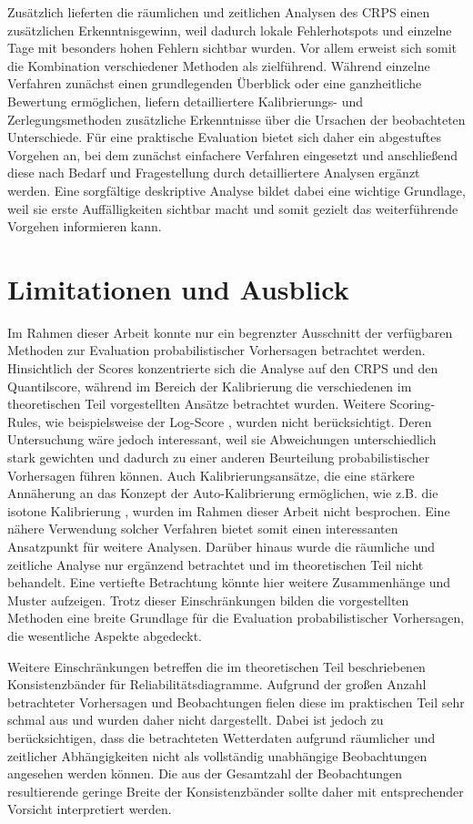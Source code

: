 Zusätzlich lieferten die räumlichen und zeitlichen Analysen des CRPS einen zusätzlichen Erkenntnisgewinn, weil dadurch lokale Fehlerhotspots und einzelne Tage mit besonders hohen Fehlern sichtbar wurden. Vor allem erweist sich somit die Kombination verschiedener Methoden als zielführend. Während einzelne Verfahren zunächst einen grundlegenden Überblick oder eine ganzheitliche Bewertung ermöglichen, liefern detailliertere Kalibrierungs- und Zerlegungsmethoden zusätzliche Erkenntnisse über die Ursachen der beobachteten Unterschiede. Für eine praktische Evaluation bietet sich daher ein abgestuftes Vorgehen an, bei dem zunächst einfachere Verfahren eingesetzt und anschließend diese nach Bedarf und Fragestellung durch detailliertere Analysen ergänzt werden. Eine sorgfältige deskriptive Analyse bildet dabei eine wichtige Grundlage, weil sie erste Auffälligkeiten sichtbar macht und somit gezielt das weiterführende Vorgehen informieren kann.

\section{Limitationen und Ausblick}
Im Rahmen dieser Arbeit konnte nur ein begrenzter Ausschnitt der verfügbaren Methoden zur Evaluation probabilistischer Vorhersagen betrachtet werden. Hinsichtlich der Scores konzentrierte sich die Analyse auf den CRPS und den Quantilscore, während im Bereich der Kalibrierung die verschiedenen im theoretischen Teil vorgestellten Ansätze betrachtet wurden. Weitere Scoring-Rules, wie beispielsweise der Log-Score \parencite{gneiting2014probabilistic}, wurden nicht berücksichtigt. Deren Untersuchung wäre jedoch interessant, weil sie Abweichungen unterschiedlich stark gewichten und dadurch zu einer anderen Beurteilung probabilistischer Vorhersagen führen können. Auch Kalibrierungsansätze, die eine stärkere Annäherung an das Konzept der Auto-Kalibrierung ermöglichen, wie z.B. die isotone Kalibrierung \parencite{arnold2025isotonic}, wurden im Rahmen dieser Arbeit nicht besprochen. Eine nähere Verwendung solcher Verfahren bietet somit einen interessanten Ansatzpunkt für weitere Analysen. Darüber hinaus wurde die räumliche und zeitliche Analyse nur ergänzend betrachtet und im theoretischen Teil nicht behandelt. Eine vertiefte Betrachtung könnte hier weitere Zusammenhänge und Muster aufzeigen. Trotz dieser Einschränkungen bilden die vorgestellten Methoden eine breite Grundlage für die Evaluation probabilistischer Vorhersagen, die wesentliche Aspekte abgedeckt.

Weitere Einschränkungen betreffen die im theoretischen Teil beschriebenen Konsistenzbänder für Reliabilitätsdiagramme. Aufgrund der großen Anzahl betrachteter Vorhersagen und Beobachtungen fielen diese im praktischen Teil sehr schmal aus und wurden daher nicht dargestellt. Dabei ist jedoch zu berücksichtigen, dass die betrachteten Wetterdaten aufgrund räumlicher und zeitlicher Abhängigkeiten nicht als vollständig unabhängige Beobachtungen angesehen werden können. Die aus der Gesamtzahl der Beobachtungen resultierende geringe Breite der Konsistenzbänder sollte daher mit entsprechender Vorsicht interpretiert werden. 

